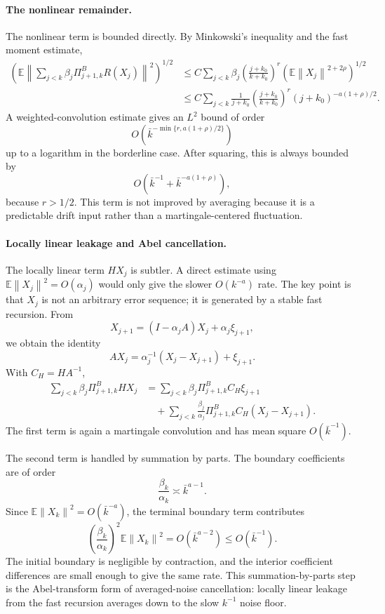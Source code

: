 \documentclass{article}
\newcommand{\E}{\mathbb{E}}
\newcommand{\norm}[1]{\left\lVert #1\right\rVert}
\begin{document}
\paragraph{The nonlinear remainder.}
The nonlinear term is bounded directly. By Minkowski's inequality and the fast moment estimate,
\[
\begin{aligned}
  \left(
  \E\left\|
  \sum_{j<k}\beta_j\Pi^B_{j+1,k}R(X_j)
  \right\|^2
  \right)^{1/2}
  &\le
  C\sum_{j<k}\beta_j
  \left(\frac{j+k_0}{k+k_0}\right)^r
  \left(\E\norm{X_j}^{2+2\rho}\right)^{1/2}  \\
  &\le
  C\sum_{j<k}
  \frac{1}{j+k_0}
  \left(\frac{j+k_0}{k+k_0}\right)^r
  (j+k_0)^{-a(1+\rho)/2}.
\end{aligned}
\]
A weighted-convolution estimate gives an $L^2$ bound of order
\[
  O\!\left(\bar k^{-\min\{r,a(1+\rho)/2\}}\right)
\]
up to a logarithm in the borderline case. After squaring, this is always bounded by
\[
  O\!\left(\bar k^{-1}+\bar k^{-a(1+\rho)}\right),
\]
because $r>1/2$. This term is not improved by averaging because it is a predictable drift input rather than a martingale-centered fluctuation.

\paragraph{Locally linear leakage and Abel cancellation.}
The locally linear term $HX_j$ is subtler. A direct estimate using
$\E\norm{X_j}^2=O(\alpha_j)$ would only give the slower $O(k^{-a})$ rate. The key point is that $X_j$ is not an arbitrary error sequence; it is generated by a stable fast recursion. From
\[
  X_{j+1}=(I-\alpha_jA)X_j+\alpha_j\xi_{j+1},
\]
we obtain the identity
\[
  AX_j=\alpha_j^{-1}(X_j-X_{j+1})+\xi_{j+1}.
\]
With $C_H=HA^{-1}$,
\[
\begin{aligned}
  \sum_{j<k}\beta_j\Pi^B_{j+1,k}HX_j
  &=
  \sum_{j<k}\beta_j\Pi^B_{j+1,k}C_H\xi_{j+1} \\
  &\quad+
  \sum_{j<k}\frac{\beta_j}{\alpha_j}
  \Pi^B_{j+1,k}C_H(X_j-X_{j+1}).
\end{aligned}
\]
The first term is again a martingale convolution and has mean square $O(\bar k^{-1})$.

The second term is handled by summation by parts. The boundary coefficients are of order
\[
  \frac{\beta_k}{\alpha_k}\asymp \bar k^{a-1}.
\]
Since $\E\norm{X_k}^2=O(\bar k^{-a})$, the terminal boundary term contributes
\[
  \left(\frac{\beta_k}{\alpha_k}\right)^2\E\norm{X_k}^2
  =
  O(\bar k^{a-2})
  \le
  O(\bar k^{-1}).
\]
The initial boundary is negligible by contraction, and the interior coefficient differences are small enough to give the same rate. This summation-by-parts step is the Abel-transform form of averaged-noise cancellation: locally linear leakage from the fast recursion averages down to the slow $k^{-1}$ noise floor.
\end{document}
